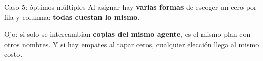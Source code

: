 \documentclass[aspectratio=169]{beamer}
\newcommand{\rejilla}[3]{%
  \foreach \i in {2,...,#2}{\foreach \j in {2,...,#3}{%
    \draw[gray!55, thin] (#1-\i-\j.north west) rectangle (#1-\i-\j.south east);}}%
  \draw[thick] (#1-2-2.north west) rectangle (#1-#2-#3.south east);}
\newcommand{\cero}[2]{\node[asignado] at (#1-#2) {};}
\newcommand{\pie}[4]{\node[font=\scriptsize\itshape, below=1mm, align=center] at ($(#1-#2-2.south west)!0.5!(#1-#2-#3.south east)$) {#4};}
\begin{document}
\begin{frame}{Caso 5: óptimos múltiples}
  Al asignar hay \textbf{varias formas} de escoger un cero por fila y columna: \textbf{todas cuestan lo mismo}.
  \begin{center}
    \qquad\qquad
  \end{center}
  {\small Ojo: si solo se intercambian \textbf{copias del mismo agente}, es el mismo plan con otros nombres.
  Y si hay empates al tapar ceros, cualquier elección llega al mismo costo.}
\end{frame}
\end{document}
